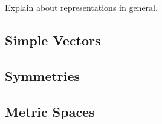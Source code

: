 Explain about representations in general. \blindtext[4]
\subsection{Simple Vectors}
\Blindtext[5]

\subsection{Symmetries}
\Blindtext[5]

\subsection{Metric Spaces}
\Blindtext[5]